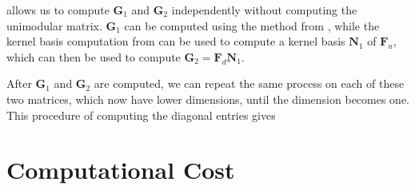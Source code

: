  allows us to compute $\mathbf{G}_{1}$
and $\mathbf{G}_{2}$ independently without computing the unimodular
matrix. $\mathbf{G}_{1}$ can be computed using the method from ,
while the kernel basis computation from 
can be used to compute a kernel basis $\mathbf{N}_{1}$ of $\mathbf{F}_{u}$,
which can then be used to compute $\mathbf{G}_{2}=\mathbf{F}_{d}\mathbf{N}_{1}$.

After $\mathbf{G}_{1}$ and $\mathbf{G}_{2}$ are computed, we can
repeat the same process on each of these two matrices, which now have
lower dimensions, until the dimension becomes one. This procedure
of computing the diagonal entries gives 




\section{Computational Cost}

